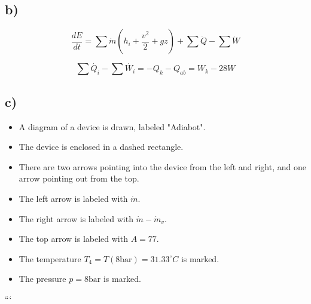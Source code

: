 \subsection*{b)}

\[
\frac{dE}{dt} = \sum \dot{m} (h_i + \frac{v^2}{2} + gz) + \sum \dot{Q} - \sum \dot{W}
\]

\[
\sum \dot{Q_i} - \sum \dot{W_i} = -Q_k - Q_{ab} = W_k - 28W
\]

\subsection*{c)}

\begin{itemize}
    \item A diagram of a device is drawn, labeled "Adiabot".
    \item The device is enclosed in a dashed rectangle.
    \item There are two arrows pointing into the device from the left and right, and one arrow pointing out from the top.
    \item The left arrow is labeled with \(\dot{m}\).
    \item The right arrow is labeled with \(\dot{m} - \dot{m}_v\).
    \item The top arrow is labeled with \(A = 77\).
    \item The temperature \(T_4 = T(8 \text{bar}) = 31.33^\circ C\) is marked.
    \item The pressure \(p = 8 \text{bar}\) is marked.
\end{itemize}

```